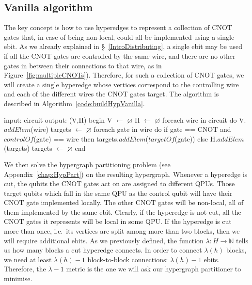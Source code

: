 \subsection{Vanilla algorithm}

The key concept is how to use hyperedges to represent a collection of CNOT gates that, in case of being non-local, could all be implemented using a single ebit. As we already explained in \S~\ref{IntroDistributing}, a single ebit may be used if all the CNOT gates are controlled by the same wire, and there are no other gates in between their connections to that wire, as in Figure~\ref{fig:multipleCNOTs}). Therefore, for such a collection of CNOT gates, we will create a single hyperedge whose vertices correspond to the controlling wire and each of the different wires the CNOT gates target. The algorithm is described in Algorithm~\ref{code:buildHypVanilla}.

\begin{algorithm}[caption={Algorithm for building the hypergraph of a given circuit. \(H\) may contain multiple hyperedges connecting the same vertices.}, label={code:buildHypVanilla}]
input: circuit
output: (V,H)
begin
  V $\gets$ $\varnothing$
  H $\gets$ $\varnothing$
  foreach wire in circuit do
    V.$addElem$(wire)
    targets $\gets$ $\varnothing$
    foreach gate in wire do
      if gate == CNOT and $controlOf$(gate) == wire then
        targets.$addElem$($targetOf$(gate))
      else
        H.$addElem$(targets)
        targets $\gets$ $\varnothing$
end
\end{algorithm}

We then solve the hypergraph partitioning problem (see Appendix~\ref{chap:HypPart}) on the resulting hypergraph. Whenever a hyperedge is cut, the qubits the CNOT gates act on are assigned to different QPUs. Those target qubits which fall in the same QPU as the control qubit will have their CNOT gate implemented locally. The other CNOT gates will be non-local, all of them implemented by the same ebit. Clearly, if the hyperedge is not cut, all the CNOT gates it represents will be local in some QPU. If the hyperedge is cut more than once, i.e.\ its vertices are split among more than two blocks, then we will require additional ebits. As we previously defined, the function \(\lambda\colon H \to \mathbb{N}\) tells us how many blocks a cut hyperedge connects. In order to connect \(\lambda(h)\) blocks, we need at least \(\lambda(h)-1\) block-to-block connections: \(\lambda(h)-1\) ebits. Therefore, the \(\lambda-1\) metric is the one we will ask our hypergraph partitioner to minimise.

